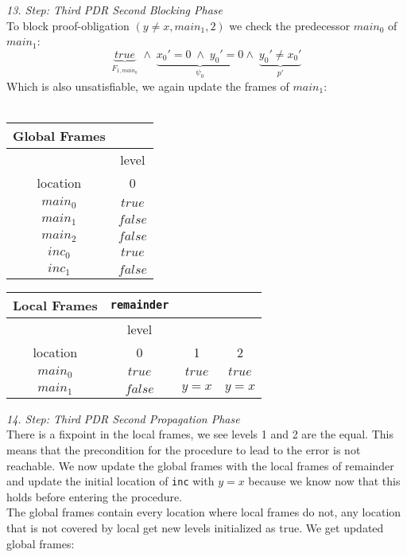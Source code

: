 \documentclass{article}
\begin{document}
	\textsl{13. Step: Third PDR Second Blocking Phase} \\
	To block proof-obligation $(y \neq x, main_1, 2)$ we check the predecessor $main_0$ of $main_1$: \\
	\begin{equation*}
	\underbrace{true}_{F_{1, main_0}}\; \land \; \underbrace{x_0' = 0 \; \land \; y_0' = 0}_{\psi_0} \land \; \underbrace{y_0' \neq x_0'}_{p'}
	\end{equation*}
	Which is also unsatisfiable, we again update the frames of $main_1$: \\ \\
	\begin{minipage}{.4\textwidth}
		\setlength\tabcolsep{0.35em}
		\begin{center}
			\begin{tabu}{cc}
				Global Frames \\
				\toprule
				& level \\
				\cmidrule(lr){2-2}
				location & 0 \\
				$main_0$ & $true$ \\
				$main_1$ & $false$ \\
				$main_2$ & $false$ \\
				$inc_0$ & $true$ \\
				$inc_1$ & $false$\\
				\bottomrule
			\end{tabu}
		\end{center}
	\end{minipage}
	\hfill
	\begin{minipage}{.5\textwidth}
		\setlength\tabcolsep{0.35em}
		\begin{center}
			\begin{tabu}{cccc}
				Local Frames & \texttt{remainder}\\
				\toprule
				& level \\
				\cmidrule(lr){2-4}
				location & 0 & 1 & 2 \\
				\cmidrule{1-4}
				$main_0$ & $true$ & $true$ & $true$ \\
				$main_1$ & $false$ & $y = x$ & $y = x$\\
				\bottomrule
			\end{tabu}
		\end{center}	
	\end{minipage} 

	\vspace*{2em}

	\textsl{14. Step: Third PDR Second Propagation Phase} \\
	There is a fixpoint in the local frames, we see levels 1 and 2 are the equal.
	This means that the precondition for the procedure to lead to the error is not reachable.
	We now update the global frames with the local frames of remainder and update the initial location of \texttt{inc} with $y = x$ because we know now that this holds before entering the procedure. \\ The global frames contain every location where local frames do not, any location that is not covered by local get new levels initialized as true. We get updated global frames: \\
	
\end{document}
